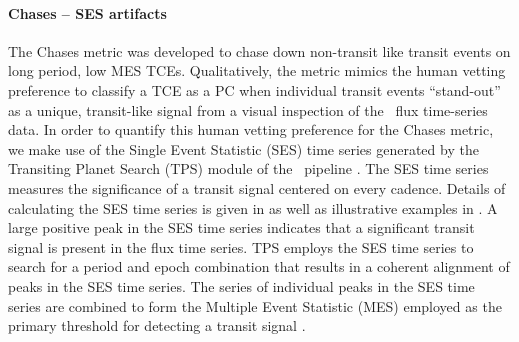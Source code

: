 \paragraph{Chases -- SES artifacts}
\label{s:chases}

The Chases metric was developed to chase down non-transit like transit events on long period, low MES TCEs. Qualitatively, the metric mimics the human vetting preference to classify a TCE as a PC when individual transit events ``stand-out'' as a unique, transit-like signal from a visual inspection of the \kepler\ flux time-series data.  In order to quantify this human vetting preference for the Chases metric, we make use of the Single Event Statistic (SES) time series generated by the Transiting Planet Search (TPS) module of the \kepler\ pipeline \citep{JenkinsKDPH}.  The SES time series measures the significance of a transit signal centered on every cadence.  Details of calculating the SES time series is given in \citet{Jenkins2002a} as well as illustrative examples in \citet{Tenenbaum2012}.  A large positive peak in the SES time series indicates that a significant transit signal is present in the flux time series.  TPS employs the SES time series to search for a period and epoch combination that results in a coherent alignment of peaks in the SES time series.  The series of individual peaks in the SES time series are combined to form the Multiple Event Statistic (MES) employed as the primary threshold for detecting a transit signal \citep{Jenkins2002a,Twicken2016,JenkinsKDPH}.  

